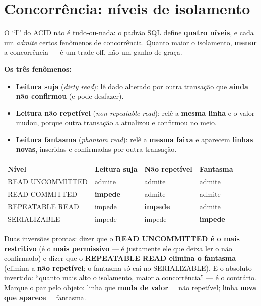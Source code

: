 \section{Concorrência: níveis de isolamento}

O ``I'' do ACID não é tudo-ou-nada: o padrão SQL define \textbf{quatro
níveis}, e cada um \emph{admite} certos fenômenos de concorrência. Quanto
maior o isolamento, \textbf{menor} a concorrência --- é um trade-off, não um
ganho de graça.

\textbf{Os três fenômenos:}
\begin{itemize}
\item \textbf{Leitura suja} (\emph{dirty read}): lê dado alterado por outra
transação que \textbf{ainda não confirmou} (e pode desfazer).
\item \textbf{Leitura não repetível} (\emph{non-repeatable read}): relê a
\textbf{mesma linha} e o valor mudou, porque outra transação a atualizou e
confirmou no meio.
\item \textbf{Leitura fantasma} (\emph{phantom read}): relê a \textbf{mesma
faixa} e aparecem \textbf{linhas novas}, inseridas e confirmadas por outra
transação.
\end{itemize}

\begin{center}
\begin{tabular}{@{}p{3.6cm}p{2.6cm}p{2.6cm}p{2.6cm}@{}}
\toprule
\textbf{Nível} & \textbf{Leitura suja} & \textbf{Não repetível} & \textbf{Fantasma} \\
\midrule
READ UNCOMMITTED & admite & admite & admite \\
READ COMMITTED & \textbf{impede} & admite & admite \\
REPEATABLE READ & impede & \textbf{impede} & admite \\
SERIALIZABLE & impede & impede & \textbf{impede} \\
\bottomrule
\end{tabular}
\end{center}

\begin{pegadinha}
Duas inversões prontas: dizer que o \textbf{READ UNCOMMITTED é o mais
restritivo} (é o \textbf{mais permissivo} --- é justamente ele que deixa ler
o não confirmado) e dizer que o \textbf{REPEATABLE READ elimina o fantasma}
(elimina a \textbf{não repetível}; o fantasma só cai no SERIALIZABLE). E o
absoluto invertido: ``quanto mais alto o isolamento, maior a concorrência''
--- é o contrário. Marque o par pelo objeto: linha que \textbf{muda de valor}
= não repetível; linha \textbf{nova que aparece} = fantasma.
\end{pegadinha}

